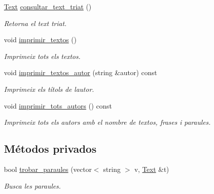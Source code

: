 \begin{DoxyCompactItemize}
\hyperlink{class_text}{Text} \hyperlink{class_cjt___textos_ab9be9e85d5d74013e4596c8bc612adae}{consultar\+\_\+text\+\_\+triat} ()
\begin{DoxyCompactList}\small\item\em Retorna el text triat. \end{DoxyCompactList}\item 
void \hyperlink{class_cjt___textos_acea595bafcaf74bb82b4eb8bb3164314}{imprimir\+\_\+textos} ()
\begin{DoxyCompactList}\small\item\em Imprimeix tots els textos. \end{DoxyCompactList}\item 
void \hyperlink{class_cjt___textos_a73d74ade60f967c56fd463b4a78c9886}{imprimir\+\_\+textos\+\_\+autor} (string \&autor) const 
\begin{DoxyCompactList}\small\item\em Imprimeix els títols de l\textquotesingle{}autor. \end{DoxyCompactList}\item 
void \hyperlink{class_cjt___textos_abfab611c433280199a2b1a035fdab840}{imprimir\+\_\+tots\+\_\+autors} () const 
\begin{DoxyCompactList}\small\item\em Imprimeix tots els autors amb el nombre de textos, frases i paraules. \end{DoxyCompactList}\end{DoxyCompactItemize}
\subsection*{Métodos privados}
\begin{DoxyCompactItemize}
\item 
bool \hyperlink{class_cjt___textos_a163e5d34f0a71a91db943909d100e45b}{trobar\+\_\+paraules} (vector$<$ string $>$ v, \hyperlink{class_text}{Text} \&t)
\begin{DoxyCompactList}\small\item\em Busca les paraules. \end{DoxyCompactList}\end{DoxyCompactItemize}
